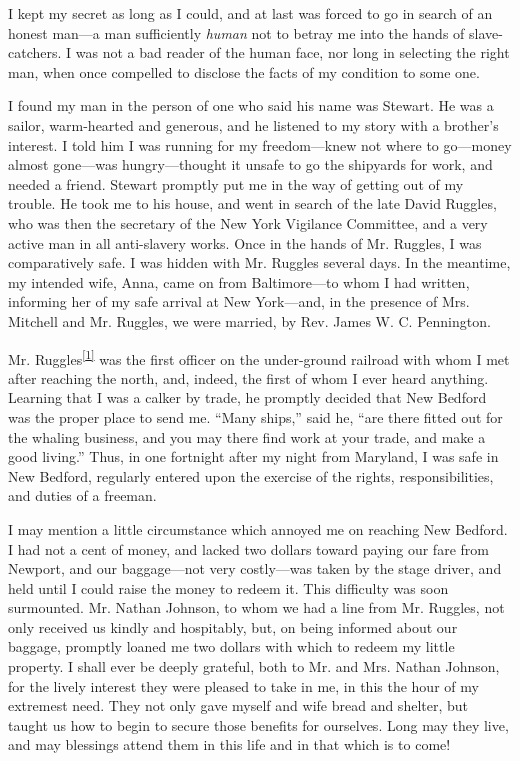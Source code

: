 I kept my secret as long as I could, and at last was forced to go in
search of an honest man---a man sufficiently \emph{human} not to betray
me into the hands of slave-catchers. I was not a bad reader of the human
face, nor long in selecting the right man, when once compelled to
disclose the facts of my condition to some one.

I found my man in the person of one who said his name was Stewart. He
was a sailor, warm-hearted and generous, and he listened to my story
with a brother's interest. I told him I was running for my
freedom---knew not where to go---money almost gone---was
hungry---thought it unsafe to go the shipyards for work, and needed a
friend. Stewart promptly put me in the way of getting out of my trouble.
He took me to his house, and went in search of the late David Ruggles,
who was then the secretary of the New York Vigilance Committee, and a
very active man in all anti-slavery works. Once in the hands of Mr.
Ruggles, I was comparatively safe. I was
{\protect\hypertarget{341}{}{}}hidden with Mr. Ruggles several days. In
the meantime, my intended wife, Anna, came on from Baltimore---to whom I
had written, informing her of my safe arrival at New York---and, in the
presence of Mrs. Mitchell and Mr. Ruggles, we were married, by Rev.
James W. C. Pennington.

Mr. Ruggles\textsuperscript{\protect\hyperlink{cite_note-1}{{[}1{]}}}
was the first officer on the under-ground railroad with whom I met after
reaching the north, and, indeed, the first of whom I ever heard
anything. Learning that I was a calker by trade, he promptly decided
that New Bedford was the proper place to send me. ``Many ships,'' said
he, ``are there fitted out for the whaling business, and you may there
find work at your trade, and make a good living.'' Thus, in one
fortnight after my night from Maryland, I was safe in New Bedford,
regularly entered upon the exercise of the rights, responsibilities, and
duties of a freeman.

I may mention a little circumstance which annoyed me on reaching New
Bedford. I had not a cent of money, and lacked two dollars toward paying
our fare from Newport, and our baggage---not very
{\protect\hypertarget{342}{}{}}costly---was taken by the stage driver,
and held until I could raise the money to redeem it. This difficulty was
soon surmounted. Mr. Nathan Johnson, to whom we had a line from Mr.
Ruggles, not only received us kindly and hospitably, but, on being
informed about our baggage, promptly loaned me two dollars with which to
redeem my little property. I shall ever be deeply grateful, both to Mr.
and Mrs. Nathan Johnson, for the lively interest they were pleased to
take in me, in this the hour of my extremest need. They not only gave
myself and wife bread and shelter, but taught us how to begin to secure
those benefits for ourselves. Long may they live, and may blessings
attend them in this life and in that which is to come!

